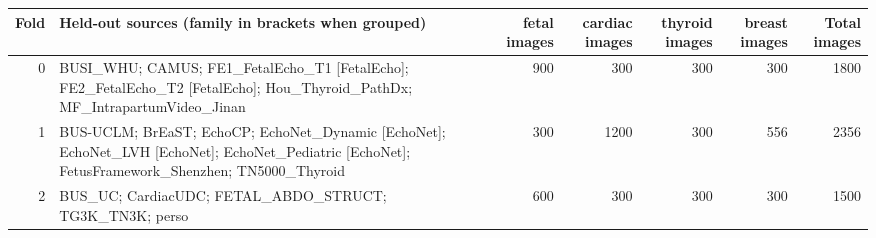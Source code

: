 \begin{tabular}{rlrrrrr}
\toprule
Fold & Held-out sources (family in brackets when grouped) & fetal images & cardiac images & thyroid images & breast images & Total images \\
\midrule
0 & BUSI_WHU; CAMUS; FE1_FetalEcho_T1 [FetalEcho]; FE2_FetalEcho_T2 [FetalEcho]; Hou_Thyroid_PathDx; MF_IntrapartumVideo_Jinan & 900 & 300 & 300 & 300 & 1800 \\
1 & BUS-UCLM; BrEaST; EchoCP; EchoNet_Dynamic [EchoNet]; EchoNet_LVH [EchoNet]; EchoNet_Pediatric [EchoNet]; FetusFramework_Shenzhen; TN5000_Thyroid & 300 & 1200 & 300 & 556 & 2356 \\
2 & BUS_UC; CardiacUDC; FETAL_ABDO_STRUCT; TG3K_TN3K; perso & 600 & 300 & 300 & 300 & 1500 \\
\bottomrule
\end{tabular}
